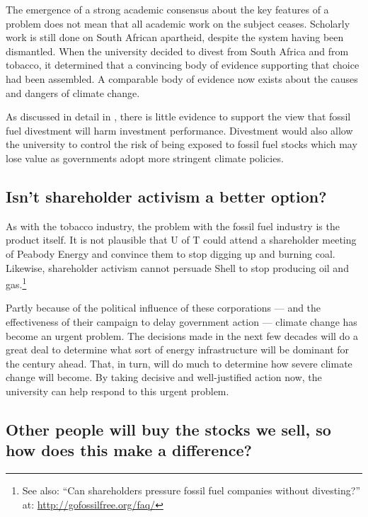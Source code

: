 \documentclass[10pt]{article}
\begin{document}



The emergence of a strong academic consensus about the key features of a problem does not mean that all academic work on the subject ceases.
Scholarly work is still done on South African apartheid, despite the system having been dismantled.
When the university decided to divest from South Africa and from tobacco, it determined that a convincing body of evidence supporting that choice had been assembled.
A comparable body of evidence now exists about the causes and dangers of climate change.



As discussed in detail in , there is little evidence to support the view that fossil fuel divestment will harm investment performance.
Divestment would also allow the university to control the risk of being exposed to fossil fuel stocks which may lose value as governments adopt more stringent climate policies.



	\subsection{Isn't shareholder activism a better option?}
	\label{ShareholderActivism}
	


As with the tobacco industry, the problem with the fossil fuel industry is the product itself.
It is not plausible that U of T could attend a shareholder meeting of Peabody Energy and convince them to stop digging up and burning coal.
Likewise, shareholder activism cannot persuade Shell to stop producing oil and gas.\footnote{See also: ``Can shareholders pressure fossil fuel companies without divesting?'' at: \url{http://gofossilfree.org/faq/}}



Partly because of the political influence of these corporations --- and the effectiveness of their campaign to delay government action --- climate change has become an urgent problem.
The decisions made in the next few decades will do a great deal to determine what sort of energy infrastructure will be dominant for the century ahead.
That, in turn, will do much to determine how severe climate change will become.
By taking decisive and well-justified action now, the university can help respond to this urgent problem.

	
	
	\subsection{Other people will buy the stocks we sell, so how does this make a difference?}
	\label{OthersWillBuy}
	
\end{document}
